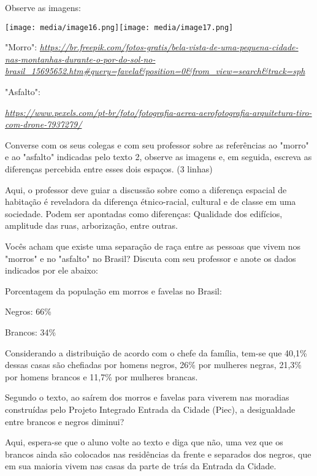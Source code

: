 Observe as imagens:

\texttt{[image: media/image16.png]}\texttt{[image: media/image17.png]}

"Morro":
\href{https://br.freepik.com/fotos-gratis/bela-vista-de-uma-pequena-cidade-nas-montanhas-durante-o-por-do-sol-no-brasil_15695652.htm\#query=favela\&position=0\&from_view=search\&track=sph}{\emph{https://br.freepik.com/fotos-gratis/bela-vista-de-uma-pequena-cidade-nas-montanhas-durante-o-por-do-sol-no-brasil\_15695652.htm\#query=favela\&position=0\&from\_view=search\&track=sph}}

"Asfalto":

\href{https://www.pexels.com/pt-br/foto/fotografia-aerea-aerofotografia-arquitetura-tiro-com-drone-7937279/}{\emph{https://www.pexels.com/pt-br/foto/fotografia-aerea-aerofotografia-arquitetura-tiro-com-drone-7937279/}}

Converse com os seus colegas e com seu professor sobre as referências ao
"morro" e ao "asfalto" indicadas pelo texto 2, observe as imagens e, em
seguida, escreva as diferenças percebida entre esses dois espaços. (3
linhas)

Aqui, o professor deve guiar a discussão sobre como a diferença espacial
de habitação é reveladora da diferença étnico-racial, cultural e de
classe em uma sociedade. Podem ser apontadas como diferenças: Qualidade
dos edifícios, amplitude das ruas, arborização, entre outras.

Vocês acham que existe uma separação de raça entre as pessoas que vivem
nos "morros" e no "asfalto" no Brasil? Discuta com seu professor e anote
os dados indicados por ele abaixo:

Porcentagem da população em morros e favelas no Brasil:

Negros: 66\%

Brancos: 34\%

Considerando a distribuição de acordo com o chefe da família, tem-se que
40,1\% dessas casas são chefiadas por homens negros, 26\% por mulheres
negras, 21,3\% por homens brancos e 11,7\% por mulheres brancas.

Segundo o texto, ao saírem dos morros e favelas para viverem nas
moradias construídas pelo Projeto Integrado Entrada da Cidade (Piec), a
desigualdade entre brancos e negros diminui?

Aqui, espera-se que o aluno volte ao texto e diga que não, uma vez que
os brancos ainda são colocados nas residências da frente e separados dos
negros, que em sua maioria vivem nas casas da parte de trás da Entrada
da Cidade.

